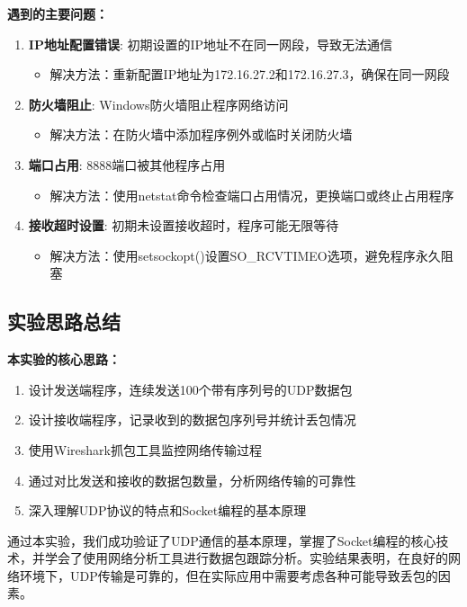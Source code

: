 \documentclass[a4paper]{article}
\begin{document}
\textbf{遇到的主要问题：}
\begin{enumerate}
    \item \textbf{IP地址配置错误}: 初期设置的IP地址不在同一网段，导致无法通信
    \begin{itemize}
        \item 解决方法：重新配置IP地址为172.16.27.2和172.16.27.3，确保在同一网段
    \end{itemize}
    
    \item \textbf{防火墙阻止}: Windows防火墙阻止程序网络访问
    \begin{itemize}
        \item 解决方法：在防火墙中添加程序例外或临时关闭防火墙
    \end{itemize}
    
    \item \textbf{端口占用}: 8888端口被其他程序占用
    \begin{itemize}
        \item 解决方法：使用netstat命令检查端口占用情况，更换端口或终止占用程序
    \end{itemize}
    
    \item \textbf{接收超时设置}: 初期未设置接收超时，程序可能无限等待
    \begin{itemize}
        \item 解决方法：使用setsockopt()设置SO\_RCVTIMEO选项，避免程序永久阻塞
    \end{itemize}
\end{enumerate}


\subsection{实验思路总结}

\textbf{本实验的核心思路：}
\begin{enumerate}
    \item 设计发送端程序，连续发送100个带有序列号的UDP数据包
    \item 设计接收端程序，记录收到的数据包序列号并统计丢包情况
    \item 使用Wireshark抓包工具监控网络传输过程
    \item 通过对比发送和接收的数据包数量，分析网络传输的可靠性
    \item 深入理解UDP协议的特点和Socket编程的基本原理
\end{enumerate}

通过本实验，我们成功验证了UDP通信的基本原理，掌握了Socket编程的核心技术，并学会了使用网络分析工具进行数据包跟踪分析。实验结果表明，在良好的网络环境下，UDP传输是可靠的，但在实际应用中需要考虑各种可能导致丢包的因素。
\end{document}
